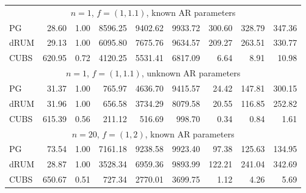 \documentclass[12pt]{article}
\begin{document}
\begin{table}
\begin{center}
\begin{tabular}{l r r r r r r r r }

      \multicolumn{9}{c}{$n=1$, $f = (1,1.1)$, known AR parameters} \\
      PG   &    28.60 &     1.00 &   8596.25 &   9402.62 &   9933.72 &    300.60 &    328.79 &    347.36 \\
      dRUM   &    29.13 &     1.00 &   6095.80 &   7675.76 &   9634.57 &    209.27 &    263.51 &    330.77 \\
      CUBS   &   620.95 &     0.72 &   4120.25 &   5531.41 &   6817.09 &      6.64 &      8.91 &     10.98
      \\ %


      \multicolumn{9}{c}{$n=1$, $f = (1,1.1)$, unknown AR parameters} \\
      PG   &    31.37 &     1.00 &    765.97 &   4636.70 &   9415.57 &     24.42 &    147.81 &    300.15 \\
      dRUM   &    31.96 &     1.00 &    656.58 &   3734.29 &   8079.58 &     20.55 &    116.85 &    252.82 \\
      CUBS   &   615.39 &     0.56 &    211.12 &    516.69 &    998.70 &      0.34 &      0.84 &      1.61
      \\ %

      \multicolumn{9}{c}{$n=20$, $f = (1,2)$, known AR parameters} \\
      PG   &    73.54 &     1.00 &   7161.18 &   9238.58 &   9923.40 &     97.38 &    125.63 &    134.95 \\
      dRUM   &    28.87 &     1.00 &   3528.34 &   6959.36 &   9893.99 &    122.21 &    241.04 &    342.69 \\
      CUBS   &   650.67 &     0.51 &    727.34 &   2770.01 &   3699.75 &      1.12 &      4.26 &      5.69
      \\ %



\end{tabular}
\end{center}
\end{table}
\end{document}
